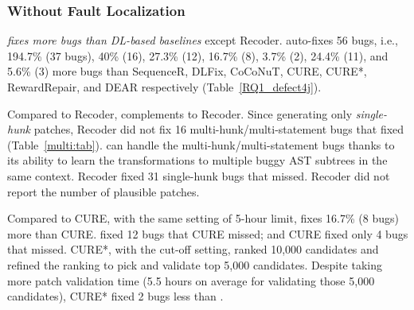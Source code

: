 \begin{table*}[t]
{\begin{center}
				\label{RQ1_defect4j}
			\end{center}
                }
		\end{table*}

\subsubsection{{\bf Without Fault Localization}}

{\em {\tool} fixes more bugs than DL-based baselines} except
Recoder. {\tool} auto-fixes 56 bugs, i.e., 194.7\% (37 bugs), 40\%
(16), 27.3\% (12), 16.7\% (8), 3.7\% (2), 24.4\% (11), and 5.6\% (3) more bugs than
SequenceR, DLFix, CoCoNuT, CURE, CURE*, RewardRepair, and DEAR respectively
(Table~\ref{RQ1_defect4j}).

Compared to Recoder, {\tool} complements to Recoder. Since generating
only {\em single-hunk} patches, Recoder did not fix 16
multi-hunk/multi-statement bugs that {\tool} fixed (Table~\ref{multi:tab}).
{\tool} can handle the multi-hunk/multi-statement bugs
thanks to its ability to learn the transformations to multiple buggy
AST subtrees in the same context.
%
Recoder fixed 31 single-hunk bugs that {\tool} missed. Recoder did not
report the number of plausible patches.


Compared to CURE, with the same setting of 5-hour limit, {\tool} fixes
16.7\% (8 bugs) more than CURE. {\tool} fixed 12 bugs that
CURE missed; and CURE fixed only 4 bugs that {\tool} missed.
%
CURE*, with the cut-off setting, ranked 10,000 candidates and refined
the ranking to pick and validate top 5,000 candidates. Despite taking
more patch validation time (5.5 hours on average for
validating those 5,000 candidates), CURE* fixed 2 bugs less than
{\tool}.


